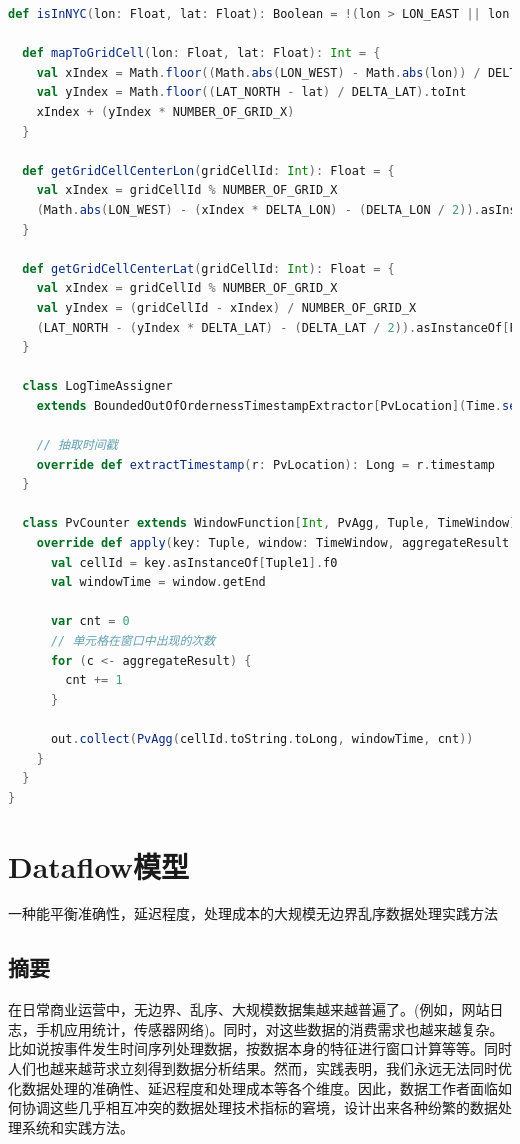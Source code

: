 \documentclass[oneside]{ctexbook}
\begin{document}
\begin{lstlisting}[language=scala]
  def isInNYC(lon: Float, lat: Float): Boolean = !(lon > LON_EAST || lon < LON_WEST) && !(lat > LAT_NORTH || lat < LAT_SOUTH)

  def mapToGridCell(lon: Float, lat: Float): Int = {
    val xIndex = Math.floor((Math.abs(LON_WEST) - Math.abs(lon)) / DELTA_LON).toInt
    val yIndex = Math.floor((LAT_NORTH - lat) / DELTA_LAT).toInt
    xIndex + (yIndex * NUMBER_OF_GRID_X)
  }

  def getGridCellCenterLon(gridCellId: Int): Float = {
    val xIndex = gridCellId % NUMBER_OF_GRID_X
    (Math.abs(LON_WEST) - (xIndex * DELTA_LON) - (DELTA_LON / 2)).asInstanceOf[Float] * -1.0f
  }

  def getGridCellCenterLat(gridCellId: Int): Float = {
    val xIndex = gridCellId % NUMBER_OF_GRID_X
    val yIndex = (gridCellId - xIndex) / NUMBER_OF_GRID_X
    (LAT_NORTH - (yIndex * DELTA_LAT) - (DELTA_LAT / 2)).asInstanceOf[Float]
  }

  class LogTimeAssigner
    extends BoundedOutOfOrdernessTimestampExtractor[PvLocation](Time.seconds(10)) {

    // 抽取时间戳
    override def extractTimestamp(r: PvLocation): Long = r.timestamp
  }

  class PvCounter extends WindowFunction[Int, PvAgg, Tuple, TimeWindow] {
    override def apply(key: Tuple, window: TimeWindow, aggregateResult: Iterable[Int], out: Collector[PvAgg]) : Unit = {
      val cellId = key.asInstanceOf[Tuple1].f0
      val windowTime = window.getEnd

      var cnt = 0
      // 单元格在窗口中出现的次数
      for (c <- aggregateResult) {
        cnt += 1
      }

      out.collect(PvAgg(cellId.toString.toLong, windowTime, cnt))
    }
  }
}
\end{lstlisting}

\appendix
\chapter{Dataflow模型}

一种能平衡准确性，延迟程度，处理成本的大规模无边界乱序数据处理实践方法

\section{摘要}

在日常商业运营中，无边界、乱序、大规模数据集越来越普遍了。(例如，网站日志，手机应用统计，传感器网络)。同时，对这些数据的消费需求也越来越复杂。比如说按事件发生时间序列处理数据，按数据本身的特征进行窗口计算等等。同时人们也越来越苛求立刻得到数据分析结果。然而，实践表明，我们永远无法同时优化数据处理的准确性、延迟程度和处理成本等各个维度。因此，数据工作者面临如何协调这些几乎相互冲突的数据处理技术指标的窘境，设计出来各种纷繁的数据处理系统和实践方法。
\end{document}
